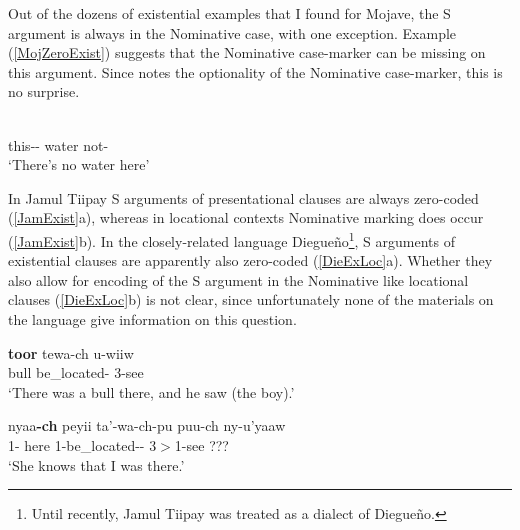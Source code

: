 
Out of the dozens of existential examples that I found for Mojave, the S argument is always in the Nominative case, with one exception.
Example (\ref{MojZeroExist}) suggests that the Nominative case-marker can be missing on this argument. 
Since \citet{Munro:1976} notes the optionality of the Nominative case-marker, this is no surprise. 

\enlargethispage{2\baselineskip}

\begin{exe}\ex\label{MojZeroExist}
\gll{}  \\
this-\dem{}-\loc{} water not-\tns{}\\
\glt `There's no water here'
\end{exe} 

In Jamul Tiipay S arguments of presentational clauses are always zero-coded (\ref{JamExist}a), whereas in locational contexts Nominative marking does occur (\ref{JamExist}b). 
In the closely-related language Diegue\~no\footnote{Until recently, Jamul Tiipay was treated as a dialect of Diegue\~no.}, S arguments of existential clauses are apparently also zero-coded (\ref{DieExLoc}a). Whether they also allow for encoding of the S argument in the Nominative like locational clauses (\ref{DieExLoc}b) is not clear, since unfortunately none of the materials on the language give information on this question. 

\begin{exe}\ex\label{JamExist}
 \begin{xlist}
\ex\gll \textbf{toor} tewa-ch u-wiiw\\
bull be\_located-\ssbj{} 3-see\\
\glt `There was a bull there, and he saw (the boy).'

\ex\gll nyaa\textbf{-ch} peyii ta'-wa-ch-pu puu-ch ny-u'yaaw\\
1-\nom{} here 1-be\_located-\NR{}-\dem{} 3$>$1-see {???}\\
\glt `She knows that I was there.' 
\end{xlist}
\end{exe}

